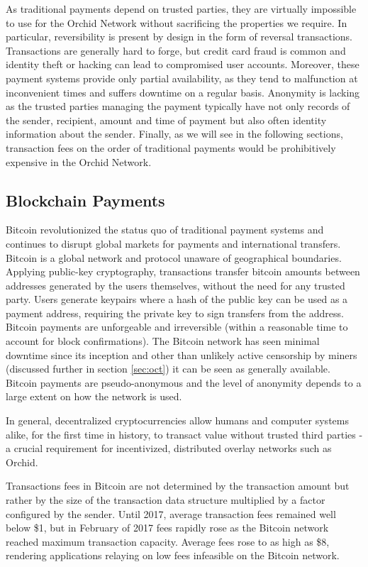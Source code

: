 As traditional payments depend on trusted parties, they are virtually impossible to use for the Orchid Network without sacrificing the properties we require. In particular, reversibility is present by design in the form of reversal transactions\cite{CardProcessing}. Transactions are generally hard to forge, but credit card fraud is common and identity theft or hacking can lead to compromised user accounts. Moreover, these payment systems provide only partial availability, as they tend to malfunction at inconvenient times and suffers downtime on a regular basis. Anonymity is lacking as the trusted parties managing the payment typically have not only records of the sender, recipient, amount and time of payment but also often identity information about the sender. Finally, as we will see in the following sections, transaction fees on the order of traditional payments would be prohibitively expensive in the Orchid Network.

\subsection{Blockchain Payments}

Bitcoin revolutionized the status quo of traditional payment systems and continues to disrupt global markets for payments and international transfers. Bitcoin is a global network and protocol unaware of geographical boundaries. Applying public-key cryptography, transactions transfer bitcoin amounts between addresses generated by the users themselves, without the need for any trusted party. Users generate keypairs where a hash of the public key can be used as a payment address, requiring the private key to sign transfers from the address\cite{BitcoinTxs}. Bitcoin payments are unforgeable and irreversible\cite{BitcoinReview} (within a reasonable time to account for block confirmations). The Bitcoin network has seen minimal downtime since its inception and other than unlikely active censorship by miners (discussed further in section \ref{sec:oct}) it can be seen as generally available. Bitcoin payments are pseudo-anonymous and the level of anonymity depends to a large extent on how the network is used\cite{BitcoinAnon}.

In general, decentralized cryptocurrencies allow humans and computer systems alike, for the first time in history, to transact value without trusted third parties - a crucial requirement for incentivized, distributed overlay networks such as Orchid.

Transactions fees in Bitcoin are not determined by the transaction amount but rather by the size of the transaction data structure multiplied by a factor configured by the sender. Until 2017, average transaction fees remained well below \$1, but in February of 2017 fees rapidly rose as the Bitcoin network reached maximum transaction capacity. Average fees rose\cite{BitInfoChartsBTC} to as high as \$8, rendering applications relaying on low fees infeasible on the Bitcoin network.

